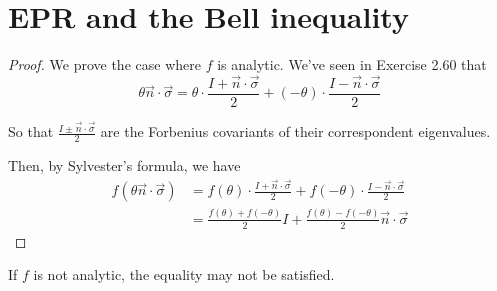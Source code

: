 \documentclass[../main.tex]{subfiles}
\begin{document}
\setcounter{chapter}{2}
\setcounter{section}{5}
\section{EPR and the Bell inequality}

\begin{problem}
\end{problem}

\begin{proof}
We prove the case where $f$ is analytic. We've seen in Exercise 2.60 that
\begin{equation*}
    \theta\Vec{n}\cdot\Vec{\sigma}=\theta\cdot\frac{I+\Vec{n}\cdot\Vec{\sigma}}{2}+(-\theta)\cdot\frac{I-\Vec{n}\cdot\Vec{\sigma}}{2}
\end{equation*}

So that $\frac{I\pm\Vec{n}\cdot\Vec{\sigma}}{2}$ are the Forbenius covariants of their correspondent eigenvalues.

Then, by Sylvester's formula, we have
\begin{align*}
    f(\theta\Vec{n}\cdot\Vec{\sigma})
    &= f(\theta)\cdot\frac{I+\Vec{n}\cdot\Vec{\sigma}}{2}+f(-\theta)\cdot\frac{I-\Vec{n}\cdot\Vec{\sigma}}{2} \\
    &= \frac{f(\theta)+f(-\theta)}{2}I+\frac{f(\theta)-f(-\theta)}{2}\Vec{n}\cdot\Vec{\sigma}
\end{align*}
\end{proof}

\begin{remark}
If $f$ is not analytic, the equality may not be satisfied.
\end{remark}
\end{document}
